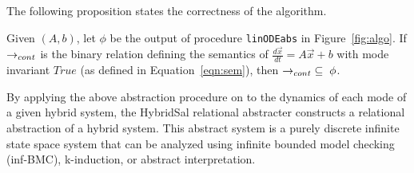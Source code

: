 \documentclass{llncs}
\def\linODEabs{\tt{linODEabs}}
\newcommand\ignore[1]{{}}
\begin{document}
The following proposition states the correctness of the algorithm.
\begin{proposition}\label{prop:corr}
Given $(A,b)$, let $\phi$ be the output of 
procedure {\linODEabs} in
Figure~\ref{fig:algo}.
If $\rightarrow_{cont}$ is the binary relation defining the
semantics of $\frac{d\vec{x}}{dt} = A\vec{x}+b$ 
with mode invariant $\mathit{True}$
(as defined in Equation~\ref{eqn:sem}), then
$\rightarrow_{cont}  \;\subseteq\; \phi$.
\end{proposition}
\ignore{
\begin{proof}(Sketch)
First, let $p(\vec{x})$ be the linear expression
$\vec{c}^T\vec{y}+\vec{d}^T\vec{z}+e$ discovered in Step~(6).
Then,
\begin{eqnarray*}
\frac{dp}{dt} &=& \vec{c}^T(A_1\vec{y}+A_2\vec{z}+\vec{b_1}) +
 \vec{d}^T\vec{b_2}
\; = \; \lambda\vec{c}^T\vec{y}+\lambda\vec{d}^T\vec{z}+\vec{c}^T\vec{b_1} + \vec{d}^T\vec{b_2}
\\
& = & \lambda*(\vec{c}^T\vec{y}+\vec{d}^T\vec{z}+\vec{c})
\; = \; \lambda*p
\end{eqnarray*}
Hence, $p(\vec{x}(t)) = p(\vec{x}(0)) e^{\lambda t}$.
Therefore, the relation added in Step~(6) to $\phi$ 
will hold between an initial state $\vec{x}$ and a future
state $\vec{x'}$.

Next, consider the quadratic relations added to $\phi$ 
in Step~(11).  Let $p_1,p_2$ be as defined in Step~(10).
Then,
\begin{eqnarray*}
\frac{d(p_1^2+p_2^2)}{dt} 
& = &
 2p_1(\alpha p_1-\beta p_2)+2p_2(\beta p_1+\alpha p_2)
\; = \;
 2\alpha(p_1^2 + p_2^2)
\end{eqnarray*}
Hence, 
$p_1(\vec{x}(t))^2+p_2(\vec{x}(t))^2 = 
 (p_1(\vec{x}(0))^2+p_2(\vec{x}(0))^2) e^{2\alpha t}$,
and therefore, the relation added in Step~(11) to $\phi$
will hold between an initial state $\vec{x}$ and a future
state $\vec{x'}$.

Finally, consider the relations added in Step~(13).
It is easy to observe that every expression $s(\vec{x},\vec{x'})$ 
in the set $E$ is equal to the time $t$ taken to reach $\vec{x}'$
from $\vec{x}$ following the linear ODE dynamics.
Hence, all these expressions need to be equal, as stated in Step~(13).
\qed
\end{proof}
\endignore}

By applying the above abstraction procedure on to the
dynamics of each mode of a given hybrid system,
the HybridSal relational abstracter constructs  a
relational abstraction of a hybrid system.
This abstract system is a purely discrete 
infinite state space system that can be analyzed
using infinite bounded model checking (inf-BMC), 
k-induction, or abstract interpretation.
\end{document}
